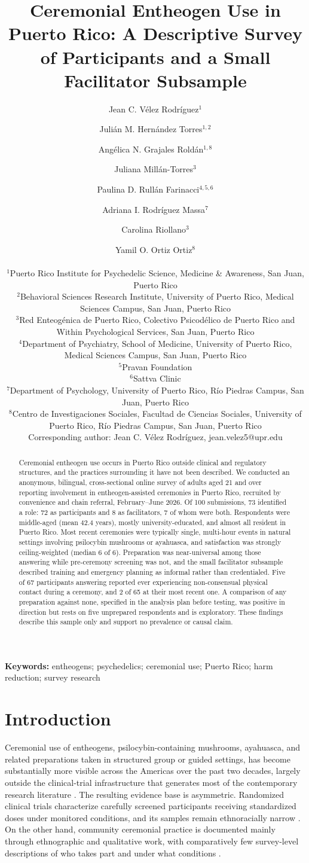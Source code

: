 \documentclass[12pt]{article}
\title{Ceremonial Entheogen Use in Puerto Rico: A Descriptive Survey of Participants
and a Small Facilitator Subsample}
\author{
  Jean C. V\'elez Rodr\'iguez$^{1}$ \and Juli\'an M. Hern\'andez Torres$^{1,2}$ \and
  Ang\'elica N. Grajales Rold\'an$^{1,8}$ \and Juliana Mill\'an-Torres$^{3}$ \and
  Paulina D. Rull\'an Farinacci$^{4,5,6}$ \and Adriana I. Rodr\'iguez Massa$^{7}$ \and
  Carolina Riollano$^{3}$ \and Yamil O. Ortiz Ortiz$^{8}$ \\[1em]
  \begin{minipage}{0.92\textwidth}\centering\small\setstretch{1.15}
  $^{1}$Puerto Rico Institute for Psychedelic Science, Medicine \& Awareness, San Juan, Puerto Rico \\
  $^{2}$Behavioral Sciences Research Institute, University of Puerto Rico, Medical Sciences Campus,
  San Juan, Puerto Rico \\
  $^{3}$Red Enteog\'enica de Puerto Rico, Colectivo Psicod\'elico de Puerto Rico and Within Psychological
  Services, San Juan, Puerto Rico \\
  $^{4}$Department of Psychiatry, School of Medicine, University of Puerto Rico, Medical Sciences Campus,
  San Juan, Puerto Rico \\
  $^{5}$Pravan Foundation \\
  $^{6}$Sattva Clinic \\
  $^{7}$Department of Psychology, University of Puerto Rico, R\'io Piedras Campus, San Juan, Puerto Rico \\
  $^{8}$Centro de Investigaciones Sociales, Facultad de Ciencias Sociales, University of Puerto Rico,
  R\'io Piedras Campus, San Juan, Puerto Rico \\[0.5em]
  Corresponding author: Jean C. V\'elez Rodr\'iguez, jean.velez5@upr.edu
  \end{minipage}
}
\date{}
\begin{document}
\maketitle
\linenumbers

\begin{abstract}
\noindent
Ceremonial entheogen use occurs in Puerto Rico outside clinical and regulatory structures, and the
practices surrounding it have not been described. We conducted an anonymous, bilingual, cross-sectional
online survey of adults aged 21 and over reporting involvement in entheogen-assisted ceremonies in Puerto
Rico, recruited by convenience and chain referral, February--June 2026. Of 100 submissions, 73
identified a role: 72 as participants and 8 as facilitators, 7 of whom were both. Respondents were
middle-aged (mean 42.4 years), mostly university-educated, and almost all resident in Puerto Rico. Most
recent ceremonies were typically single, multi-hour events in natural settings involving psilocybin
mushrooms or ayahuasca, and satisfaction was strongly ceiling-weighted (median 6 of 6). Preparation was
near-universal among those answering while pre-ceremony screening was not, and the small facilitator
subsample described training and emergency planning as informal rather than credentialed. Five of 67
participants answering reported ever experiencing non-consensual physical contact during a ceremony, and 2
of 65 at their most recent one. A comparison of any preparation against none, specified in the analysis
plan before testing, was positive in direction but rests on five unprepared respondents and is exploratory.
These findings describe this sample only and support no prevalence or causal claim.
\end{abstract}

\noindent\textbf{Keywords:} entheogens; psychedelics; ceremonial use; Puerto Rico; harm reduction; survey research

\section{Introduction}

Ceremonial use of entheogens, psilocybin-containing mushrooms, ayahuasca, and related preparations taken
in structured group or guided settings, has become substantially more visible across the Americas over the
past two decades, largely outside the clinical-trial infrastructure that generates most of the contemporary
research literature \citep{carvalho2025scoping}. The resulting evidence base is asymmetric. Randomized
clinical trials characterize carefully screened participants receiving standardized doses under monitored
conditions, and its samples remain ethnoracially narrow
\citep{hughes2024ethnoracial,marcus2026psychedelics}. On the other hand, community ceremonial practice is
documented mainly through ethnographic and qualitative work, with comparatively few survey-level
descriptions of who takes part and under what conditions
\citep{carvalho2025scoping,teixeira2026ayahuasca}.
\end{document}
